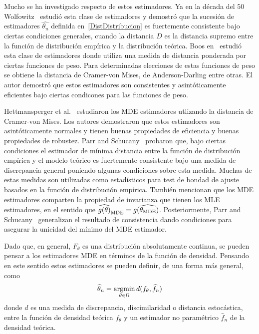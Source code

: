 Mucho se ha investigado respecto de estos estimadores. Ya en la década del $50$ Wolfowitz~\cite{wolfowitz1953, wolfowitz1957} estudió esta clase de estimadores y demostró que la sucesión de estimadores ${\widehat{\theta_n}}$ definida en~\ref{DistDistribucion} es fuertemente consistente bajo ciertas condiciones generales, cuando la distancia $D$ es la distancia supremo entre la función de distribución empírica y la distribución teórica.
Boos en~\cite{Boos1981} estudió esta clase de estimadores donde utiliza una medida de distancia ponderada por ciertas funciones de peso. Para determinadas elecciones de estas funciones de peso se obtiene la distancia de Cramer-von Mises, de Anderson-Darling entre otras. El autor demostró que estos estimadores son consistentes y asintóticamente eficientes bajo ciertas condicones para las funciones de peso.

Hettmansperger et al.~\cite{HettmanSperger1994} estudiaron los MDE estimadores utlizando la distancia de Cramer-von Mises. Los autores demostraron que estos estimadores son asintóticamente normales y tienen buenas propiedades de eficiencia y buenas propiedades de robustez. Parr and Schucany~\cite{Parr1980} probaron que, bajo ciertas condiciones el estimador de mínima distancia entre la función de distribución empírica y el modelo teórico es fuertemente consistente bajo una medida de discrepancia general poniendo algunas condiciones sobre esta medida. Muchas de estas medidas son utilizadas como estadísticos para test de bondad de ajuste basados en la función de distribución empírica. También mencionan que los MDE estimadores comparten la propiedad de invarianza que tienen los MLE estimadores, en el sentido que $\widehat{g(\theta)}_{\tiny{\text{MDE}}}=g(\widehat{\theta_{\tiny{\text{MDE}}}})$. Posteriormente, Parr and Schucany~\cite{parr1982} generalizan el resultado de consistencia dando condiciones para asegurar la unicidad del mínimo del MDE estimador.

Dado que, en general, $F_{\theta}$ es una distribución absolutamente continua, se pueden pensar a los estimadores MDE en términos de la función de densidad. Pensando en este sentido estos estimadores se pueden definir, de una forma más general, como 
\begin{align}
\widehat{\theta}_n=\mathop{\rm argmin} \limits_{\theta\in\Omega} d(f_{\theta}, \widehat{f}_n)
\end{align}
donde $d$ es una medida de discrepancia, discimilaridad o distancia estocástica, entre la función de densidad teórica $f_{\theta}$ y un estimador no paramétrico $\widehat{f}_n$ de la densidad teórica.

